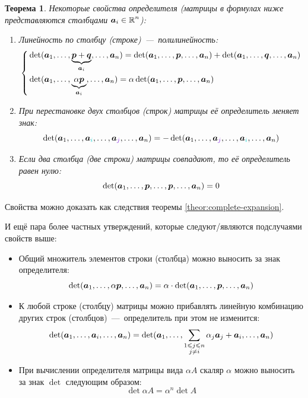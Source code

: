 \documentclass[a4paper,12pt]{article}
\newtheorem{theorem}{Теорема}[section]
\theoremstyle{definition}
\theoremstyle{remark}
\theoremstyle{remark}
\begin{document}
  \begin{theorem}
    Некоторые свойства определителя (матрицы в формулах ниже представляются столбцами $\bds a_i \hm\in \RR^n$):
    \begin{enumerate}
      \item Линейность по столбцу (строке)~---~полилинейность:
        \[
          \left\{
            \begin{aligned}
              &\det (\boldsymbol a_1, \ldots, \underbrace{\boldsymbol p + \boldsymbol q}_{\boldsymbol a_i}, \ldots, \boldsymbol a_n)
                = \det (\boldsymbol a_1, \ldots, \boldsymbol p, \ldots, \boldsymbol a_n)
                + \det (\boldsymbol a_1, \ldots, \boldsymbol q, \ldots, \boldsymbol a_n)\\
              &\det (\boldsymbol a_1, \ldots, \underbrace{\alpha \boldsymbol p}_{\boldsymbol a_i}, \ldots, \boldsymbol a_n)
                = \alpha \det (\boldsymbol a_1, \ldots, \boldsymbol p, \ldots, \boldsymbol a_n)
            \end{aligned}
          \right.
        \]
      \item При перестановке двух столбцов (строк) матрицы её определитель меняет знак:
        \[
          \det (\bds a_1, \ldots, \bds a_{\textcolor{cyanL}{i}}, \ldots, \bds a_{\textcolor{purpleL}{j}}, \ldots, \bds a_n)
          = -\det (\bds a_1, \ldots, \bds a_{\textcolor{purpleL}{j}}, \ldots, \bds a_{\textcolor{cyanL}{i}}, \ldots, \bds a_n)
        \]
      \item Если два столбца (две строки) матрицы совпадают, то её определитель равен нулю:
        \[
          \det (\boldsymbol a_1, \ldots, \boldsymbol p, \ldots, \boldsymbol p, \ldots, \boldsymbol a_n) = 0
        \]
    \end{enumerate}
    
  \end{theorem}
  
  Свойства можно доказать как следствия теоремы \ref{theor:complete-expansion}.
  
  И ещё пара более частных утверждений, которые следуют/являются подслучаями свойств выше:
  \begin{itemize}
    \item Общий множитель элементов строки (столбца) можно выносить за знак определителя:
      \[
        \det (\boldsymbol a_1, \ldots, \alpha \boldsymbol p, \ldots, \boldsymbol a_n)
          = \alpha \cdot \det (\boldsymbol a_1, \ldots, \boldsymbol p, \ldots, \boldsymbol a_n)
      \]
    \item К любой строке (столбцу) матрицы можно прибавлять линейную комбинацию других строк (столбцов)~---~определитель при этом не изменится:
      \[
        \det (\boldsymbol a_1, \ldots, \boldsymbol a_i, \ldots, \boldsymbol a_n)
          = \det (\boldsymbol a_1, \ldots, \sum_{\substack{1 \leqslant j \leqslant n\\j \not= i}} \alpha_j \boldsymbol a_j + \boldsymbol a_i, \ldots, \boldsymbol a_n)
      \]
    \item При вычислении определителя матрицы вида $\alpha A$ скаляр $\alpha$ можно выносить за знак $\det$ следующим образом:
      \[
        \det \alpha A = \alpha^n \det A
      \]
  \end{itemize}
  
\end{document}
